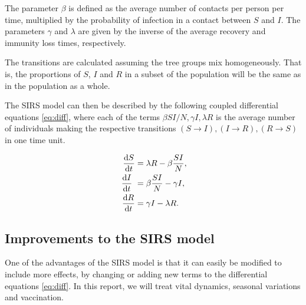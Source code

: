 \documentclass[a4paper,10pt,twocolumn]{article}
\begin{document}
The parameter $\beta$ is defined as the average number of contacts per person per time, multiplied by the probability of infection in a contact between $S$ and $I$.
The parameters $\gamma$ and $\lambda$ are given by the inverse of the average recovery and immunity loss times, respectively.

The transitions are calculated assuming the tree groups mix homogeneously. That is, the proportions of $S$, $I$ and $R$ in a subset of the population will be the same as in the population as a whole.  



The SIRS model can then be described by the following coupled differential equations \ref{eq:diff}, where each of the terms $\beta SI/N, \gamma I, \lambda R$ is the average number of individuals making the respective transitions $(S\to I), (I\to R), (R\to S)$ in one time unit.

\begin{subequations}\label{eq:diff}
\begin{align}
\dv{S}{t} &= \lambda R - \beta\frac{SI}{N},
\\ \dv{I}{t} &= \beta\frac{SI}{N} - \gamma I,
\\ \dv{R}{t} &= \gamma I - \lambda R.
\end{align} 
\end{subequations}


\subsection{Improvements to the SIRS model}

One of the advantages of the SIRS model is that it can easily be modified to include more effects, by changing or adding new terms to the differential equations \ref{eq:diff}. 
In this report, we will treat vital dynamics, seasonal variations and vaccination.
\end{document}
